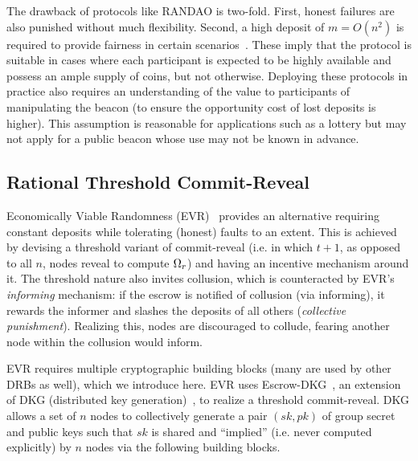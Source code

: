 The drawback of protocols like RANDAO is two-fold. First, honest failures are also punished without much flexibility. Second, a high deposit of $m = O(n^2)$ is required to provide fairness in certain scenarios~\cite{andrychowicz2014secure, bentov2014use}. These imply that the protocol is suitable in cases where each participant is expected to be highly available and possess an ample supply of coins, but not otherwise.
Deploying these protocols in practice also requires an understanding of the value to participants of manipulating the beacon (to ensure the opportunity cost of lost deposits is higher). This assumption is reasonable for applications such as a lottery but may not apply for a public beacon whose use may not be known in advance.


\subsection{Rational Threshold Commit-Reveal}
Economically Viable Randomness (EVR)~\cite{david2020economically} provides an alternative requiring constant deposits while tolerating (honest) faults to an extent. This is achieved by devising a threshold variant of commit-reveal (i.e. in which $t + 1$, as opposed to all $n$, nodes reveal to compute $\Omega_r$) and having an incentive mechanism around it. The threshold nature also invites collusion, which is counteracted by EVR's \textit{informing} mechanism: if the escrow is notified of collusion (via informing), it rewards the informer and slashes the deposits of all others (\textit{collective punishment}). Realizing this, nodes are discouraged to collude, fearing another node within the collusion would inform.

EVR requires multiple cryptographic building blocks (many are used by other DRBs as well), which we introduce here. EVR uses Escrow-DKG~\cite{david2019rational}, an extension of DKG (distributed key generation)~\cite{pedersen1991threshold,gennaro1999secure}, to realize a threshold commit-reveal. DKG allows a set of $n$ nodes to collectively generate a pair $(sk, pk)$ of group secret and public keys such that $sk$ is shared and ``implied'' (i.e. never computed explicitly) by $n$ nodes via the following building blocks.

